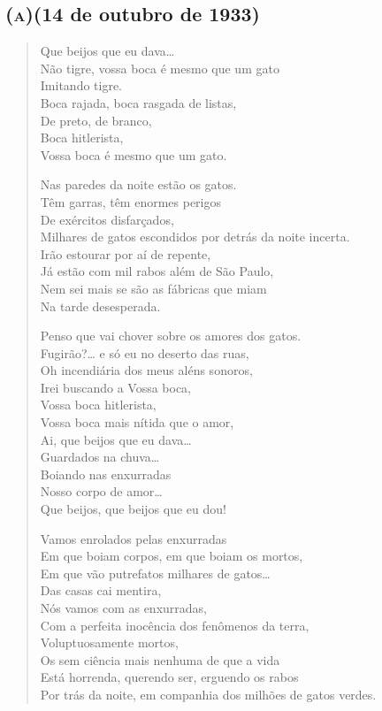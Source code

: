 \subsection*{\textsc{(a)}\break (14 de outubro de 1933)}

\begin{verse}
Que beijos que eu dava\ldots{}\\
Não tigre, vossa boca é mesmo que um gato\\
Imitando tigre.\\
Boca rajada, boca rasgada de listas,\\
De preto, de branco,\\
Boca hitlerista,\\
Vossa boca é mesmo que um gato.

Nas paredes da noite estão os gatos.\\
Têm garras, têm enormes perigos\\
De exércitos disfarçados,\\
Milhares de gatos escondidos por detrás da noite incerta.\\
Irão estourar por aí de repente,\\
Já estão com mil rabos além de São Paulo,\\
Nem sei mais se são as fábricas que miam\\
Na tarde desesperada.

Penso que vai chover sobre os amores dos gatos.\\
Fugirão?\ldots{} e só eu no deserto das ruas,\\
Oh incendiária dos meus aléns sonoros,\\
Irei buscando a Vossa boca,\\
Vossa boca hitlerista,\\
Vossa boca mais nítida que o amor,\\
Ai, que beijos que eu dava\ldots{}\\
Guardados na chuva\ldots{}\\
Boiando nas enxurradas\\
Nosso corpo de amor\ldots{}\\
Que beijos, que beijos que eu dou!

Vamos enrolados pelas enxurradas\\
Em que boiam corpos, em que boiam os mortos,\\
Em que vão putrefatos milhares de gatos\ldots{}\\
Das casas cai mentira,\\
Nós vamos com as enxurradas,\\
Com a perfeita inocência dos fenômenos da terra,\\
Voluptuosamente mortos,\\
Os sem ciência mais nenhuma de que a vida\\
Está horrenda, querendo ser, erguendo os rabos\\
Por trás da noite, em companhia dos milhões de gatos verdes.
\end{verse}

